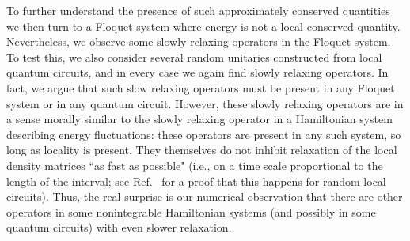 \documentclass[twocolumn,superscriptaddress, prb]{revtex4-1}
\begin{document}
To further understand the presence of such approximately conserved quantities we then turn to a Floquet system where energy is not a local conserved quantity.
Nevertheless, we observe some slowly relaxing operators in the Floquet system.
To test this, we also consider several random unitaries constructed from local quantum circuits, and in every case we again find slowly relaxing operators.
In fact, we argue that such slow relaxing operators must be present in any Floquet system or in any quantum circuit.  However, these slowly relaxing operators are in a sense morally similar to the slowly relaxing operator in a Hamiltonian system describing energy fluctuations: these operators are present in any such system, so long as locality is present.  They themselves do not inhibit relaxation of the local density matrices ``as fast as possible" (i.e., on a time scale proportional to the length of the interval; see Ref.~ for a proof that this happens for random local circuits).  
Thus, the real surprise is our numerical observation that there are other operators in some nonintegrable Hamiltonian systems (and possibly in some quantum circuits) with even slower relaxation.

\end{document}
